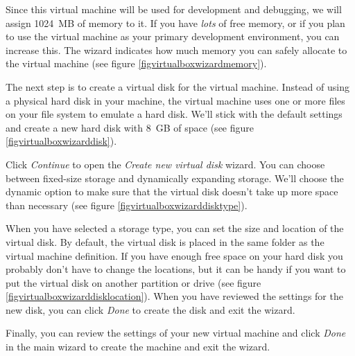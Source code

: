 \documentclass[ebook,10pt,twoside,openright]{memoir}
\begin{document}
Since this virtual machine will be used for development and debugging, we will assign 1024~MB of memory to it. If you have \emph{lots} of free memory, or if you plan to use the virtual machine as your primary development environment, you can increase this. The wizard indicates how much memory you can safely allocate to the virtual machine (see figure \ref{figvirtualboxwizardmemory}).


The next step is to create a virtual disk for the virtual machine. Instead of using a physical hard disk in your machine, the virtual machine uses one or more files on your file system to emulate a hard disk. We'll stick with the default settings and create a new hard disk with 8~GB of space (see figure \ref{figvirtualboxwizarddisk}).


Click \emph{Continue} to open the \emph{Create new virtual disk} wizard. You can choose between fixed-size storage and dynamically expanding storage. We'll choose the dynamic option to make sure that the virtual disk doesn't take up more space than necessary (see figure \ref{figvirtualboxwizarddisktype}).


When you have selected a storage type, you can set the size and location of the virtual disk. By default, the virtual disk is placed in the same folder as the virtual machine definition. If you have enough free space on your hard disk you probably don't have to change the locations, but it can be handy if you want to put the virtual disk on another partition or drive (see figure \ref{figvirtualboxwizarddisklocation}). When you have reviewed the settings for the new disk, you can click \emph{Done} to create the disk and exit the wizard.


Finally, you can review the settings of your new virtual machine and click \emph{Done} in the main wizard to create the machine and exit the wizard.
\end{document}
